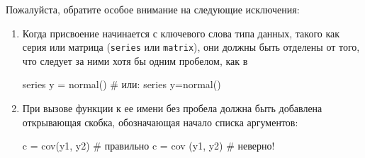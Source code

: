 Пожалуйста, обратите особое внимание на следующие исключения:
\begin{enumerate}
\item Когда присвоение начинается с ключевого слова типа данных,
  такого как серия или матрица (\texttt{series} или \texttt{matrix}),
  они должны быть отделены от того, что следует за ними хотя бы одним
  пробелом, как в
\begin{code}
series y = normal() # или: series y=normal()
\end{code}
\item При вызове функции к ее имени без пробела должна быть добавлена
  открывающая скобка, обозначающая начало списка аргументов:
\begin{code}
c = cov(y1, y2)  # правильно
c = cov (y1, y2) # неверно!
\end{code}
\end{enumerate}

\label{LastPage}


